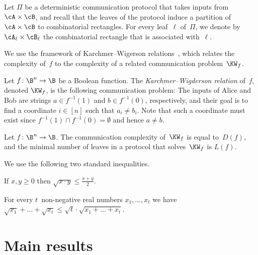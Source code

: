 \documentclass{toc}
\begin{document}
\begin{notation}
\label{notation:partition-to-rectangles}Let $\Pi$ be a deterministic communication
protocol that takes inputs from $\cA\times\cB$, and recall that the
leaves of the protocol induce a partition of $\cA\times\cB$ to combinatorial
rectangles. For every leaf~$\ell$ of~$\Pi$, we denote by $\cA_{\ell}\times\cB_{\ell}$
the combinatorial rectangle that is associated with~$\ell$. 
\end{notation}

We use the framework of Karchmer--Wigerson relations~\cite{KW90},
which relates the complexity of~$f$ to the complexity of a related
communication problem~$\KW_{f}$. 
\begin{definition}[\cite{KW90}]
Let $f\colon\B^{n}\to\B$ be a Boolean function. The \emph{Karchmer--Wigderson
relation} of~$f$, denoted $\KW_{f}$, is the following communication
problem: The inputs of Alice and Bob are strings $a\in f^{-1}(1)$
and $b\in f^{-1}(0)$, respectively, and their goal is to find a coordinate
$i\in\left[n\right]$ such that $a_{i}\ne b_{i}$. Note that such
a coordinate must exist since $f^{-1}(1)\cap f^{-1}(0)=\emptyset$
and hence $a\ne b$. 
\end{definition}

\begin{theorem}
\label{thm:KW-connection}Let $f\colon\B^{n}\to\B$. The communication
complexity of~$\KW_{f}$ is equal to~$D(f)$, and the minimal number
of leaves in a protocol that solves~$\KW_{f}$ is $L(f)$. 
\end{theorem}

%
We use the following two standard inequalities.
\begin{fact}
%
%
%
%
%
If $x,y\ge 0$ then $\sqrt{x\cdot y}\le\frac{x+y}{2}$.
\end{fact}

\begin{fact}
\label{fact:special-cauchy-schwarz} For every $t$~non-negative real
numbers $x_{1},\ldots,x_{t}$ we have $\sqrt{x_{1}}+\ldots+\sqrt{x_{t}}\le\sqrt{t}\cdot\sqrt{x_{1}+\ldots+x_{t}}$.   \qedhere
\end{fact}

%
%
%
%
%

\section{\label{sec:Main-results}Main results}
\end{document}
